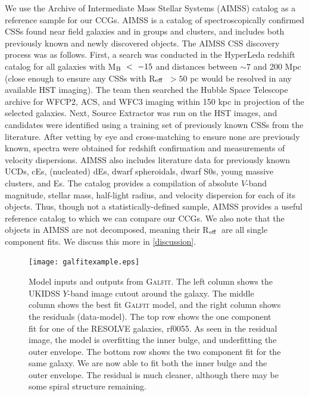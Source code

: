 \documentclass[iop,apj]{emulateapj}
\newcommand{\Reff}{R$_{\rm eff}$}
\begin{document}
  We use the Archive of Intermediate Mass Stellar Systems (AIMSS) catalog \citep{Norris2014,Forbes2014,Janz2015} as a reference sample for our CCGs.  AIMSS is a catalog of spectroscopically confirmed CSSs found near field galaxies and in groups and clusters, and includes both previously known and newly discovered objects. The AIMSS CSS discovery process was as follows. First, a search was conducted in the HyperLeda redshift catalog \citep{Paturel2003} for all galaxies with M$_{\rm B}~<~-15$ and distances between $\sim 7$ and 200 Mpc (close enough to ensure any CSSs with \Reff\ $> 50$ pc would be resolved in any available HST imaging). The team then searched the Hubble Space Telescope archive for WFCP2, ACS, and WFC3 imaging within 150 kpc in projection of the selected galaxies. Next, Source Extractor was run on the HST images, and candidates were identified using a training set of previously known CSSs from the literature. After vetting by eye and cross-matching to ensure none are previously known, spectra were obtained for redshift confirmation and measurements of velocity dispersions. AIMSS also includes literature data for previously known UCDs, cEs, (nucleated) dEs, dwarf spheroidals, dwarf S0s, young massive clusters, and Es. The catalog provides a compilation of absolute $V$-band magnitude, stellar mass, half-light radius, and velocity dispersion for each of its objects. Thus, though not a statistically-defined sample, AIMSS provides a useful reference catalog to which we can compare our CCGs. We also note that the objects in AIMSS are not decomposed, meaning their \Reff\ are all single component fits. We discuss this more in \autoref{discussion}.

\begin{figure}[b]
\begin{center}
\texttt{[image: galfitexample.eps]}
\caption{Model inputs and outputs from \textsc{Galfit}. The left column shows the UKIDSS $Y$-band image cutout around the galaxy. The middle column shows the best fit \textsc{Galfit} model, and the right column shows the residuals (data-model). The top row shows the one component fit for one of the RESOLVE galaxies, rf0055. As seen in the residual image, the model is overfitting the inner bulge, and underfitting the outer envelope. The bottom row shows the two component fit for the same galaxy. We are now  able to fit both the inner bulge and the outer envelope. The residual is much cleaner, although there may be some spiral structure remaining.}
\label{fig:galfit}
\end{center}
\end{figure}
\end{document}
